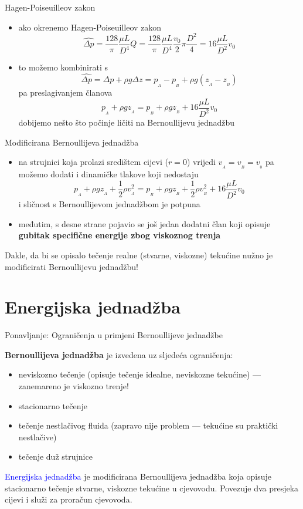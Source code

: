 \documentclass[croatian]{beamer}
\begin{document}
\begin{frame}{Hagen-Poiseuilleov zakon}

\begin{itemize}
\item ako okrenemo Hagen-Poiseuilleov zakon
\[
\widehat{\Delta p}=\frac{128}{\pi}\frac{\mu L}{D^{4}}Q=\frac{128}{\pi}\frac{\mu L}{D^{4}}\frac{v_{0}}{2}\pi\frac{D^{2}}{4}=16\frac{\mu L}{D^{2}}v_{0}
\]
\item to možemo kombinirati s
\[
\widehat{\Delta p}=\Delta p+\rho g\Delta z=p_{_{A}}-p_{_{B}}+\rho g(z_{_{A}}-z_{_{B}})
\]
pa preslagivanjem članova 
\[
p_{_{A}}+\rho gz_{_{A}}=p_{_{B}}+\rho gz_{_{B}}+16\frac{\mu L}{D^{2}}v_{0}
\]
dobijemo nešto što počinje ličiti na Bernoullijevu jednadžbu
\end{itemize}
\end{frame}

\begin{frame}{Modificirana Bernoullijeva jednadžba}

\begin{itemize}
\item na strujnici koja prolazi središtem cijevi ($r = 0$) vrijedi $v_{_{A}}=v_{_{B}}=v_{_{0}}$
pa možemo dodati i dinamičke tlakove koji nedostaju
\[
p_{_{A}}+\rho gz_{_{A}}+\frac{1}{2}\rho v_{_{A}}^{2}=p_{_{B}}+\rho gz_{_{B}}+\frac{1}{2}\rho v_{_{B}}^{2}+16\frac{\mu L}{D^{2}}v_{0}
\]
i sličnost s Bernoullijevom jednadžbom je potpuna
\item međutim, s desne strane pojavio se još jedan dodatni član koji opisuje
\textbf{gubitak specifične energije zbog viskoznog trenja}
\end{itemize}
\begin{alertblock}{}
Dakle, da bi se opisalo tečenje realne (stvarne, viskozne) tekućine
nužno je modificirati Bernoullijevu jednadžbu!
\end{alertblock}
\end{frame}

\section{Energijska jednadžba}
\begin{frame}{Ponavljanje: Ograničenja u primjeni Bernoullijeve jednadžbe}

\textbf{Bernoullijeva jednadžba} je izvedena uz sljedeća ograničenja:
\begin{itemize}
\item neviskozno tečenje (opisuje tečenje idealne, neviskozne tekućine)
--- zanemareno je viskozno trenje!
\item stacionarno tečenje
\item tečenje nestlačivog fluida (zapravo nije problem --- tekućine su
praktički nestlačive)
\item tečenje duž strujnice
\end{itemize}
\begin{alertblock}{}
\textcolor{blue}{\large{}\alert{Energijska jednadžba}} je modificirana
Bernoullijeva jednadžba koja opisuje stacionarno tečenje stvarne, viskozne tekućine u
cjevovodu. Povezuje dva presjeka cijevi i služi za proračun cjevovoda.
\end{alertblock}
\end{frame}
\end{document}
